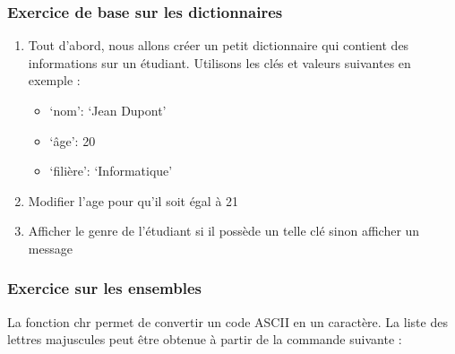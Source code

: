 \documentclass[letterpaper,10pt,english]{sphinxhowto}
\begin{document}
\subsubsection{Exercice de base sur les dictionnaires}
\label{\detokenize{cours3_conteneur_exercices:exercice-de-base-sur-les-dictionnaires}}\begin{enumerate}
%
\item {} 
\sphinxAtStartPar
Tout d’abord, nous allons créer un petit dictionnaire qui contient des informations sur un étudiant. Utilisons les clés et valeurs suivantes en exemple :
\begin{itemize}
\item {} 
\sphinxAtStartPar
‘nom’: ‘Jean Dupont’

\item {} 
\sphinxAtStartPar
‘âge’: 20

\item {} 
\sphinxAtStartPar
‘filière’: ‘Informatique’

\end{itemize}

\item {} 
\sphinxAtStartPar
Modifier l’age pour qu’il soit égal à 21

\item {} 
\sphinxAtStartPar
Afficher le genre de l’étudiant si il possède un telle clé sinon afficher un message

\end{enumerate}


\subsubsection{Exercice sur les ensembles}
\label{\detokenize{cours3_conteneur_exercices:exercice-sur-les-ensembles}}
\sphinxAtStartPar
La fonction chr permet de convertir un code ASCII en un caractère. La liste des lettres majuscules peut être obtenue à partir de la commande suivante :

\begin{sphinxVerbatim}[commandchars=\\\{\}]
  \PYG{p}{[}    \PYG{p}{]}
\end{sphinxVerbatim}
\end{document}
